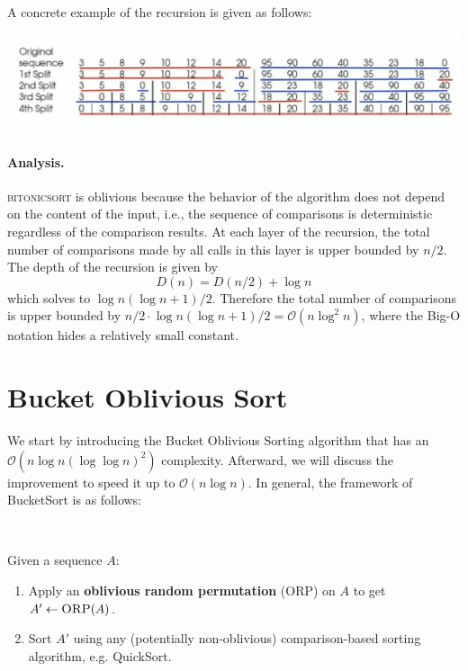 A concrete example of the recursion is given as follows:

\includegraphics[scale=0.27]{fig1.png}

\paragraph{Analysis.} \textsc{bitonicsort} is oblivious because the behavior of the algorithm does not depend on the content of the input, i.e., the sequence of comparisons is deterministic regardless of the comparison results. At each layer of the recursion, the total number of comparisons made by all calls in this layer is upper bounded by $n/2$. The depth of the recursion is given by \[D(n)  = D(n/2) + \log n \] which solves to $\log n (\log n+1)/2$. Therefore the total number of comparisons is upper bounded by $n/2 \cdot \log n (\log n+1)/2 = \mathcal{O}(n \log^2 n)$, where the Big-O notation hides a relatively small constant.

\section{Bucket Oblivious Sort \cite{bucket}}

We start by introducing the Bucket Oblivious Sorting algorithm that has an $\mathcal{O}(n\log n (\log\log n)^2)$ complexity. Afterward, we will discuss the improvement to speed it up to $\mathcal{O}(n\log n)$. In general, the framework of BucketSort is as follows: 

$ $

\begin{mdframed}[innertopmargin=5pt, skipabove=\topskip, skipbelow=\topskip,align=left]


Given a sequence $A$:
\begin{enumerate}
    \item Apply an \textbf{oblivious random permutation} (\textsc{ORP}) on $A$ to get $A' \gets \textsc{ORP}(A)$.
    \item Sort $A'$ using any (potentially non-oblivious) comparison-based sorting algorithm, e.g. QuickSort.
\end{enumerate}
\end{mdframed}

